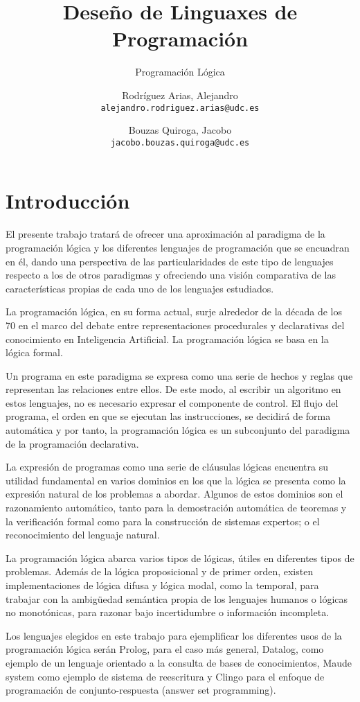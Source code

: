 \documentclass[11pt,captions=nooneline,DIV=14, parskip=full]{scrartcl}
\title{Deseño de Linguaxes de Programación}
\subtitle{Programación Lógica}
\author{Rodríguez Arias, Alejandro\\
	\texttt{alejandro.rodriguez.arias@udc.es}
	\and Bouzas Quiroga, Jacobo\\
	\texttt{jacobo.bouzas.quiroga@udc.es}}
\date{\displaydate{release}}
\begin{document}
\maketitle
\clearpage
\tableofcontents
\clearpage

\section{Introducción}
\label{sec:intro}

El presente trabajo tratará de ofrecer una aproximación al paradigma de la programación lógica y los diferentes lenguajes de programación que se encuadran en él, dando una perspectiva de las particularidades de este tipo de lenguajes respecto a los de otros paradigmas y ofreciendo una visión comparativa de las características propias de cada uno de los lenguajes estudiados.

La programación lógica, en su forma actual, surje alrededor de la década de los 70 en el marco del debate entre representaciones procedurales y declarativas del conocimiento en Inteligencia Artificial. La programación lógica se basa en la lógica formal.

Un programa en este paradigma se expresa como una serie de hechos y reglas que representan las relaciones entre ellos. De este modo, al escribir un algoritmo en estos lenguajes, no es necesario expresar el componente de control. El flujo del programa, el orden en que se ejecutan las instrucciones, se decidirá de forma automática y por tanto, la programación lógica es un subconjunto del paradigma de la programación declarativa.

La expresión de programas como una serie de cláusulas lógicas encuentra su utilidad fundamental en varios dominios en los que la lógica se presenta como la expresión natural de los problemas a abordar. Algunos de estos dominios son el razonamiento automático, tanto para la demostración automática de teoremas y la verificación formal como para la construcción de sistemas expertos; o el reconocimiento del lenguaje natural.

La programación lógica abarca varios tipos de lógicas, útiles en diferentes tipos de problemas. Además de la lógica proposicional y de primer orden, existen implementaciones de lógica difusa y lógica modal, como la temporal, para trabajar con la ambigüedad semántica propia de los lenguajes humanos o lógicas no monotónicas, para razonar bajo incertidumbre o información incompleta.

Los lenguajes elegidos en este trabajo para ejemplificar los diferentes usos de la programación lógica serán Prolog, para el caso más general, Datalog, como ejemplo de un lenguaje orientado a la consulta de bases de conocimientos, Maude system como ejemplo de sistema de reescritura y Clingo para el enfoque de programación de conjunto-respuesta (answer set programming).
\end{document}
